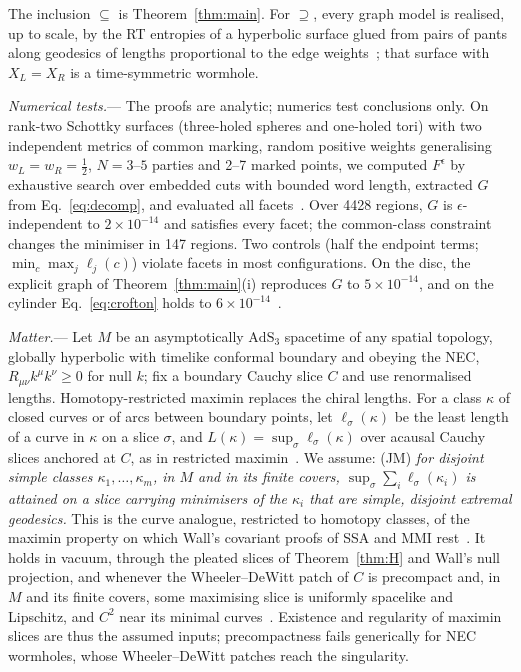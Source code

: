 \documentclass[aps,prl,twocolumn,superscriptaddress,nofootinbib,amsmath,amssymb]{revtex4-2}
\theoremstyle{definition}
\newcommand{\AdS}{\mathrm{AdS}_3}
\newcommand{\eps}{\epsilon}
\begin{document}
The inclusion $\subseteq$ is Theorem~\ref{thm:main}. For $\supseteq$, every graph model is realised, up to scale,
by the RT entropies of a hyperbolic surface glued from pairs of pants along geodesics of lengths proportional to
the edge weights~\cite{Bao2015}; that surface with $X_L=X_R$ is a time-symmetric wormhole.

\emph{Numerical tests.}---%
The proofs are analytic; numerics test conclusions only. On rank-two Schottky surfaces (three-holed spheres and
one-holed tori) with two independent metrics of common marking, random positive weights generalising
$w_L=w_R=\frac12$, $N=3$--$5$ parties and 2--7 marked points, we computed $F^\eps$ by exhaustive search over
embedded cuts with bounded word length, extracted $G$ from Eq.~\eqref{eq:decomp}, and evaluated all facets~\cite{SM}. Over 4428 regions, $G$ is $\eps$-independent to $2\times10^{-14}$ and satisfies every facet; the common-class
constraint changes the minimiser in 147 regions. Two controls (half the endpoint terms; $\min_c\max_j\ell_j(c)$) violate
facets in most configurations. On the disc, the explicit graph of
Theorem~\ref{thm:main}(i) reproduces $G$ to $5\times10^{-14}$, and on the cylinder Eq.~\eqref{eq:crofton}
holds to $6\times10^{-14}$~\cite{SM}.

\emph{Matter.}---%
Let $M$ be an asymptotically $\AdS$ spacetime of any spatial topology, globally hyperbolic with timelike conformal
boundary and obeying the NEC, $R_{\mu\nu}k^\mu k^\nu\ge0$ for null $k$; fix a boundary Cauchy slice $C$ and use
renormalised lengths. Homotopy-restricted maximin replaces the chiral lengths. For a class $\kappa$ of closed curves or of arcs between boundary points, let $\ell_\sigma(\kappa)$ be the least length of a
curve in $\kappa$ on a slice $\sigma$, and $L(\kappa)=\sup_\sigma\ell_\sigma(\kappa)$ over acausal Cauchy slices anchored
at $C$, as in restricted maximin~\cite{MarolfWallWang2019,GradoWhiteMarolfWeinberg2021}. We assume:
(JM) \emph{for disjoint simple classes $\kappa_1,\dots,\kappa_m$, in $M$ and in its finite covers,
$\sup_\sigma\sum_i\ell_\sigma(\kappa_i)$ is attained on a slice carrying minimisers of the $\kappa_i$ that are simple, disjoint
extremal geodesics.} This is the curve analogue, restricted to homotopy classes, of the maximin property on which
Wall's covariant proofs of SSA and MMI rest~\cite{Wall2014}. It holds in vacuum, through the pleated slices of
Theorem~\ref{thm:H} and Wall's null projection, and whenever the Wheeler--DeWitt patch of $C$ is precompact and, in $M$ and its finite
covers, some maximising slice is uniformly spacelike and Lipschitz, and $C^2$ near its minimal curves~\cite{SM}. Existence and regularity of maximin slices are thus the assumed
inputs; precompactness fails generically for NEC wormholes, whose Wheeler--DeWitt patches reach the singularity.
\end{document}
